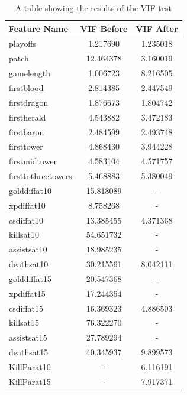 \begin{table}[h]
    \centering
    \caption{A table showing the results of the VIF test}
    \begin{tabular}{l c c}
        \toprule
        \textbf{Feature Name} & \textbf{VIF Before} & \textbf{VIF After} \\
        \midrule
            playoffs &	1.217690  & 1.235018 \\
            patch &	12.464378  & 3.160019 \\
            gamelength &	1.006723 & 8.216505 \\
            firstblood &	2.814385  & 2.447549 \\
            firstdragon &	1.876673  & 1.804742 \\
            firstherald &	4.543882  & 3.472183 \\
            firstbaron &	2.484599 & 2.493748 \\
            firsttower &	4.868430 & 3.944228 \\
            firstmidtower &	4.583104 & 4.571757 \\
            firsttothreetowers &	5.468883 & 5.380049 \\
            golddiffat10 &	15.818089 & - \\
            xpdiffat10 &	8.758268 & - \\
            csdiffat10 &	13.385455 & 4.371368  \\
            killsat10 &	54.651732 & - \\
            assistsat10 &	18.985235 & - \\
            deathsat10 &	30.215561 & 8.042111  \\
            golddiffat15 &	20.547368 & - \\
            xpdiffat15 &	17.244354 & - \\
            csdiffat15 &	16.369323 & 4.886503  \\
            killsat15 &	76.322270 & - \\
            assistsat15 &	27.789294 & - \\
            deathsat15 &	40.345937 & 9.899573  \\
            KillParat10 & - & 6.116191 \\
            KillParat15 & - & 7.917371 \\
        \bottomrule
    \end{tabular}
    \label{tab:VIF}
\end{table}



